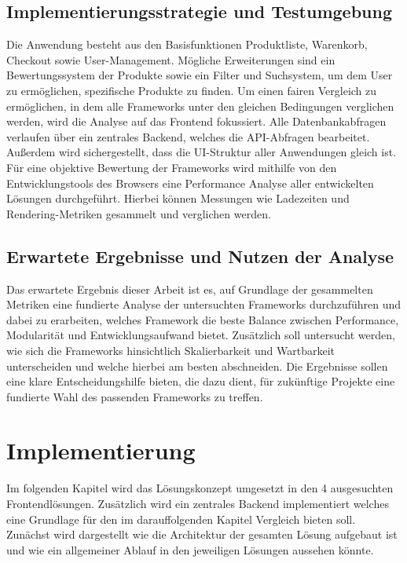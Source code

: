 \documentclass[oneside]{ausarbeitung}
\begin{document}
\section{Implementierungsstrategie und Testumgebung}

Die Anwendung besteht aus den Basisfunktionen Produktliste, Warenkorb, Checkout sowie User-Management. Mögliche Erweiterungen sind ein Bewertungssystem der Produkte sowie ein Filter und Suchsystem, um dem User zu ermöglichen, spezifische Produkte zu finden. 
Um einen fairen Vergleich zu ermöglichen, in dem alle Frameworks unter den gleichen Bedingungen verglichen werden, wird die Analyse auf das Frontend fokussiert. Alle Datenbankabfragen verlaufen über ein zentrales Backend, welches die API-Abfragen bearbeitet. 
Außerdem wird sichergestellt, dass die UI-Struktur aller Anwendungen gleich ist. 
Für eine objektive Bewertung der Frameworks wird mithilfe von den Entwicklungstools des Browsers eine Performance Analyse aller entwickelten Lösungen durchgeführt. Hierbei können Messungen wie Ladezeiten und Rendering-Metriken gesammelt und verglichen werden. 

\section{Erwartete Ergebnisse und Nutzen der Analyse}

Das erwartete Ergebnis dieser Arbeit ist es, auf Grundlage der gesammelten Metriken eine fundierte Analyse der untersuchten Frameworks durchzuführen und dabei zu erarbeiten, welches Framework die beste Balance zwischen Performance, Modularität und Entwicklungsaufwand bietet.
Zusätzlich soll untersucht werden, wie sich die Frameworks hinsichtlich Skalierbarkeit und Wartbarkeit unterscheiden und welche hierbei am besten abschneiden.
Die Ergebnisse sollen eine klare Entscheidungshilfe bieten, die dazu dient, für zukünftige Projekte eine fundierte Wahl des passenden Frameworks zu treffen.

\chapter{Implementierung}
\label{cha:implementierung}

Im folgenden Kapitel wird das Lösungskonzept umgesetzt in den 4 ausgesuchten Frontendlösungen. Zusätzlich wird ein zentrales Backend implementiert welches eine Grundlage für den im darauffolgenden Kapitel Vergleich bieten soll. Zunächst wird dargestellt wie die Architektur der gesamten Lösung aufgebaut ist und wie ein allgemeiner Ablauf in den jeweiligen Lösungen aussehen könnte. 
\end{document}
